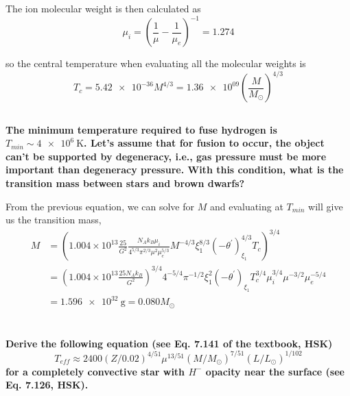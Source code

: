 The ion molecular weight is then calculated as
\begin{equation*}
    \mu_i = \left(\frac{1}{\mu}-\frac{1}{\mu_e}\right)^{-1} = 1.274
\end{equation*}

so the central temperature when evaluating all the molecular weights is
\begin{equation*}
    T_c = \num{5.42e-36} M^{4/3} = \num{1.36e+09} \left(\frac{M}{M_\odot}\right)^{4/3}
\end{equation*}



\subsection{}
\textbf{The minimum temperature required to fuse hydrogen is $T_{min}\sim\SI{4e6}{\kelvin}$. 
Let's assume that for fusion to occur, the object can't be supported by degeneracy, i.e., gas pressure must be more important than degeneracy pressure. 
With this condition, what is the transition mass between stars and brown dwarfs?}

From the previous equation, we can solve for $M$ and evaluating at $T_{min}$ will give us the transition mass,
\begin{align*}
        M &= \left(1.004\times 10^{13} \frac{25}{G^2}\frac{N_Ak_B\mu_i}{4^{5/3}\pi^{2/3} \mu^2\mu_e^{5/3}}M^{-4/3}\xi^{8/3}_1(-\theta^\prime)^{4/3}_{\xi_1}T_c\right)^{3/4} \\
        &= \left(1.004\times 10^{13} \frac{25 N_Ak_B}{G^2}\right)^{3/4}4^{-5/4}\pi^{-1/2}\xi_1^{2}(-\theta^\prime)_{\xi_1} T_c^{3/4}\mu_i^{3/4}\mu^{-3/2}\mu_e^{-5/4}\\
        &= \SI{1.596e32}{\g} = 0.080 M_\odot
\end{align*}



\section{}
\textbf{Derive the following equation (see Eq. 7.141 of the textbook, HSK)
\begin{equation*}
    T_{eff}\approx 2400(Z/0.02)^{4/51}\mu^{13/51}(M/M_\odot)^{7/51}(L/L_\odot)^{1/102}
\end{equation*}
for a completely convective star with $H^{-}$ opacity near the surface (see Eq. 7.126, HSK).}

